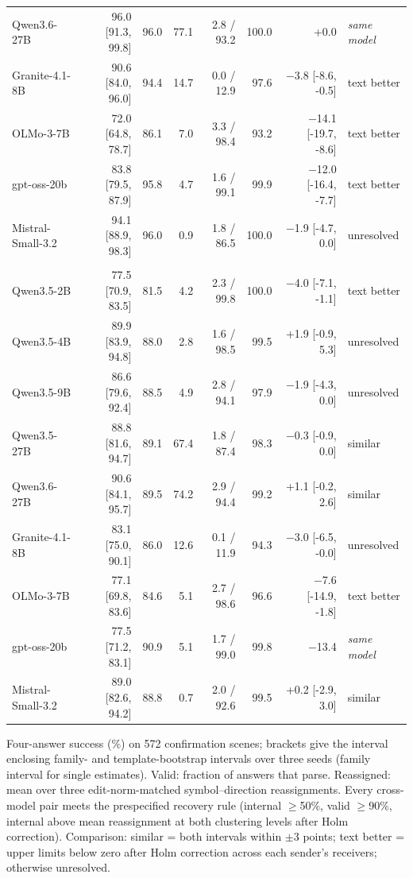 \begin{table}[!htbp]
\begin{tabular*}{\linewidth}{@{\extracolsep{\fill}}lrrrrrrl@{}}
Qwen3.6-27B & 96.0 [91.3, 99.8] & 96.0 & 77.1 & 2.8 / 93.2 & 100.0 & +0.0 & \textit{same model} \\
Granite-4.1-8B & 90.6 [84.0, 96.0] & 94.4 & 14.7 & 0.0 / 12.9 & 97.6 & $-$3.8 [-8.6, -0.5] & text better \\
OLMo-3-7B & 72.0 [64.8, 78.7] & 86.1 & 7.0 & 3.3 / 98.4 & 93.2 & $-$14.1 [-19.7, -8.6] & text better \\
gpt-oss-20b & 83.8 [79.5, 87.9] & 95.8 & 4.7 & 1.6 / 99.1 & 99.9 & $-$12.0 [-16.4, -7.7] & text better \\
Mistral-Small-3.2 & 94.1 [88.9, 98.3] & 96.0 & 0.9 & 1.8 / 86.5 & 100.0 & $-$1.9 [-4.7, 0.0] & unresolved \\
\addlinespace[2pt]\multicolumn{8}{@{}l}{\textit{gpt-oss sender}} \\
Qwen3.5-2B & 77.5 [70.9, 83.5] & 81.5 & 4.2 & 2.3 / 99.8 & 100.0 & $-$4.0 [-7.1, -1.1] & text better \\
Qwen3.5-4B & 89.9 [83.9, 94.8] & 88.0 & 2.8 & 1.6 / 98.5 & 99.5 & +1.9 [-0.9, 5.3] & unresolved \\
Qwen3.5-9B & 86.6 [79.6, 92.4] & 88.5 & 4.9 & 2.8 / 94.1 & 97.9 & $-$1.9 [-4.3, 0.0] & unresolved \\
Qwen3.5-27B & 88.8 [81.6, 94.7] & 89.1 & 67.4 & 1.8 / 87.4 & 98.3 & $-$0.3 [-0.9, 0.0] & similar \\
Qwen3.6-27B & 90.6 [84.1, 95.7] & 89.5 & 74.2 & 2.9 / 94.4 & 99.2 & +1.1 [-0.2, 2.6] & similar \\
Granite-4.1-8B & 83.1 [75.0, 90.1] & 86.0 & 12.6 & 0.1 / 11.9 & 94.3 & $-$3.0 [-6.5, -0.0] & unresolved \\
OLMo-3-7B & 77.1 [69.8, 83.6] & 84.6 & 5.1 & 2.7 / 98.6 & 96.6 & $-$7.6 [-14.9, -1.8] & text better \\
gpt-oss-20b & 77.5 [71.2, 83.1] & 90.9 & 5.1 & 1.7 / 99.0 & 99.8 & $-$13.4 & \textit{same model} \\
Mistral-Small-3.2 & 89.0 [82.6, 94.2] & 88.8 & 0.7 & 2.0 / 92.6 & 99.5 & +0.2 [-2.9, 3.0] & similar \\
\bottomrule
\end{tabular*}
\par\vspace{3pt}
{\footnotesize\raggedright Four-answer success (\%) on 572 confirmation scenes; brackets give the interval enclosing family- and template-bootstrap intervals over three seeds (family interval for single estimates). Valid: fraction of answers that parse. Reassigned: mean over three edit-norm-matched symbol--direction reassignments. Every cross-model pair meets the prespecified recovery rule (internal $\ge$50\%, valid $\ge$90\%, internal above mean reassignment at both clustering levels after Holm correction). Comparison: similar = both intervals within $\pm3$ points; text better = upper limits below zero after Holm correction across each sender's receivers; otherwise unresolved.\par}
\end{table}
